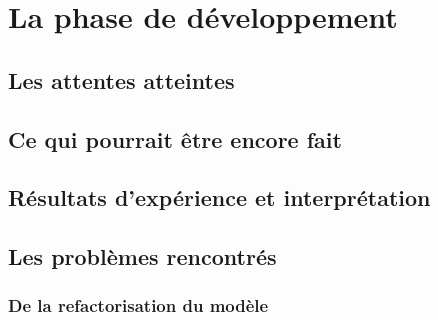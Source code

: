 \section{La phase de développement}

\subsection{Les attentes atteintes}

\subsection{Ce qui pourrait être encore fait}

\subsection{Résultats d'expérience et interprétation}

\subsection{Les problèmes rencontrés}

	\subsubsection{De la refactorisation du modèle}